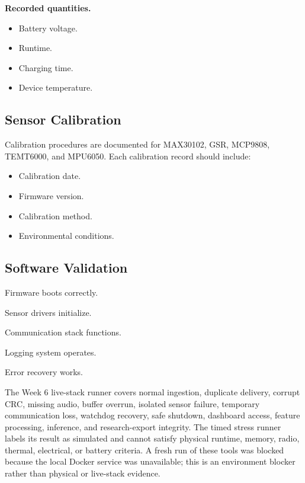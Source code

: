 \textbf{Recorded quantities.}
\begin{itemize}
    \item Battery voltage.
    \item Runtime.
    \item Charging time.
    \item Device temperature.
\end{itemize}

\subsection{Sensor Calibration}
\label{sec:sensor-calibration}

Calibration procedures are documented for MAX30102, GSR, MCP9808, TEMT6000, and MPU6050. Each calibration record should include:
\begin{itemize}
    \item Calibration date.
    \item Firmware version.
    \item Calibration method.
    \item Environmental conditions.
\end{itemize}

\subsection{Software Validation}
\label{sec:software-validation}

\begin{checklist}
    \item Firmware boots correctly.
    \item Sensor drivers initialize.
    \item Communication stack functions.
    \item Logging system operates.
    \item Error recovery works.
\end{checklist}

The Week 6 live-stack runner covers normal ingestion, duplicate delivery, corrupt CRC, missing audio, buffer overrun, isolated sensor failure, temporary communication loss, watchdog recovery, safe shutdown, dashboard access, feature processing, inference, and research-export integrity. The timed stress runner labels its result as simulated and cannot satisfy physical runtime, memory, radio, thermal, electrical, or battery criteria. A fresh run of these tools was blocked because the local Docker service was unavailable; this is an environment blocker rather than physical or live-stack evidence.

